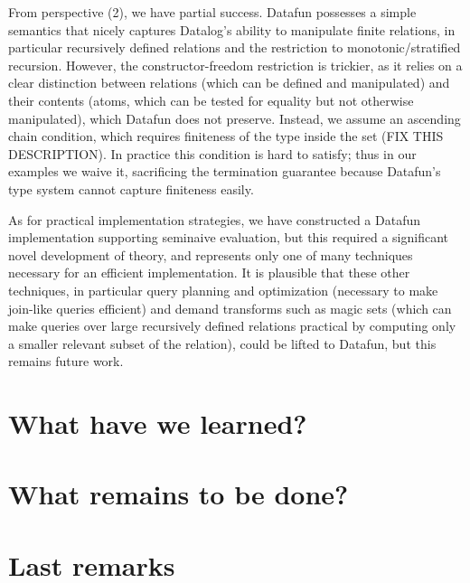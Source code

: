 \noindent
From perspective (2), we have partial success. Datafun possesses a simple
semantics that nicely captures Datalog's ability to manipulate finite relations,
in particular recursively defined relations and the restriction to
monotonic/stratified recursion. However, the constructor-freedom restriction is
trickier, as it relies on a clear distinction between relations (which can be
defined and manipulated) and their contents (atoms, which can be tested for
equality but not otherwise manipulated), which Datafun does not preserve.
Instead, we assume an ascending chain condition, which requires finiteness of
the type inside the set (FIX THIS DESCRIPTION). In practice this condition is
hard to satisfy; thus in our examples we waive it, sacrificing the termination
guarantee because Datafun's type system cannot capture finiteness easily.

As for practical implementation strategies, we have constructed a Datafun
implementation supporting seminaive evaluation, but this required a significant
novel development of theory, and represents only one of many techniques
necessary for an efficient implementation. It is plausible that these other
techniques, in particular query planning and optimization (necessary to make
join-like queries efficient) and demand transforms such as magic sets (which can
make queries over large recursively defined relations practical by computing
only a smaller relevant subset of the relation), could be lifted to Datafun, but
this remains future work.


\section{What have we learned?}


\section{What remains to be done?}


\section{Last remarks}

\XXX
